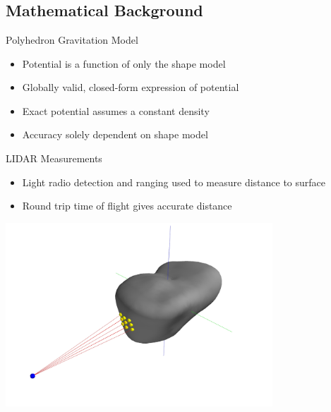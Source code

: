 \documentclass[11pt,professionalfonts]{beamer}
\begin{document}
\section*{}
\subsection*{Mathematical Background}
\begin{frame}{Polyhedron Gravitation Model}

\begin{itemize}
    \item Potential is a function of only the shape model
    \item Globally valid, closed-form expression of potential
    \item Exact potential assumes a constant density 
    \item Accuracy solely dependent on shape model
\end{itemize}

\end{frame}

\begin{frame}{LIDAR Measurements }
    \begin{itemize}
        \item Light radio detection and ranging used to measure distance to surface
        \item Round trip time of flight gives accurate distance
    \end{itemize}

    \begin{center}
        \includegraphics[width=0.75\textwidth]{figures/castalia_raycasting_plot.jpg}
    \end{center}
\end{frame}
\end{document}
